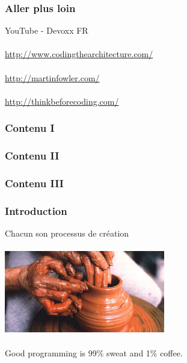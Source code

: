 \documentclass{beamer}
\begin{document}
\begin{frame}
	\frametitle{Aller plus loin}

	YouTube - Devoxx FR
    \\~\\
	\url{http://www.codingthearchitecture.com/}
    \\~\\
	\url{http://martinfowler.com/}
    \\~\\
    \url{http://thinkbeforecoding.com/}
    
\end{frame}

\begin{frame}
	\frametitle{Contenu I}
	\tableofcontents[sections={1-2}]
\end{frame}

\begin{frame}
	\frametitle{Contenu II}
	\tableofcontents[sections={3-4}]
\end{frame}

\begin{frame}
	\frametitle{Contenu III}
	\tableofcontents[sections={5-6}]
\end{frame}



\begin{frame}
	\frametitle{Introduction}

	Chacun son processus de cr\'{e}ation
    \\~\\
	\includegraphics[width=7cm]{img/pottery.jpg}
    \\~\\
	Good programming is 99\% sweat and 1\% coffee.
\end{frame}










\end{document}
